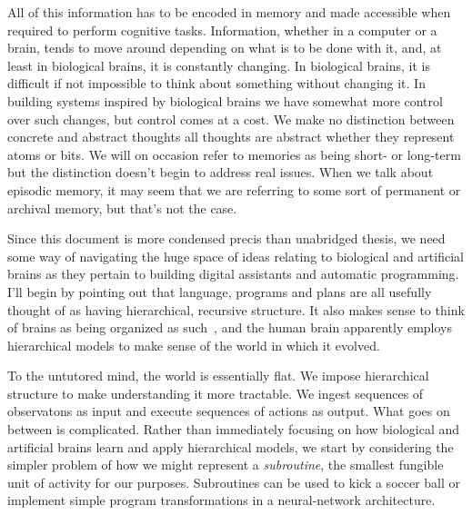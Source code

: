 All of this information has to be encoded in memory and made accessible when required to perform cognitive tasks. Information, whether in a computer or a brain, tends to move around depending on what is to be done with it, and, at least in biological brains, it is constantly changing. In biological brains, it is difficult if not impossible to think about something without changing it. In building systems inspired by biological brains we have somewhat more control over such changes, but control comes at a cost. We make no distinction between concrete and abstract thoughts \emdash{} all thoughts are abstract whether they represent atoms or bits. We will on occasion refer to memories as being short- or long-term but the distinction doesn't begin to address real issues. When we talk about episodic memory, it may seem that we are referring to some sort of permanent or archival memory, but that's not the case.

Since this document is more condensed precis than unabridged thesis, we need some way of navigating the huge space of ideas relating to biological and artificial brains as they pertain to building digital assistants and automatic programming. I'll begin by pointing out that language, programs and plans are all usefully thought of as having hierarchical, recursive structure. It also makes sense to think of brains as being organized as such~\cite{Ballard2015,Kurzweil2012,DeanAMAI-06,GeorgeandHawkinsIJCNN-05,DeanAAAI-05,Hawkins04}, and the human brain apparently employs hierarchical models to make sense of the world in which it evolved. 

To the untutored mind, the world is essentially flat. We impose hierarchical structure to make understanding it more tractable. We ingest sequences of observatons as input and execute sequences of actions as output. What goes on between is complicated. Rather than immediately focusing on how biological and artificial brains learn and apply hierarchical models, we start by considering the simpler problem of how we might represent a {\it{subroutine}}, the smallest fungible unit of activity for our purposes. Subroutines can be used to kick a soccer ball or implement simple program transformations in a neural-network architecture.


